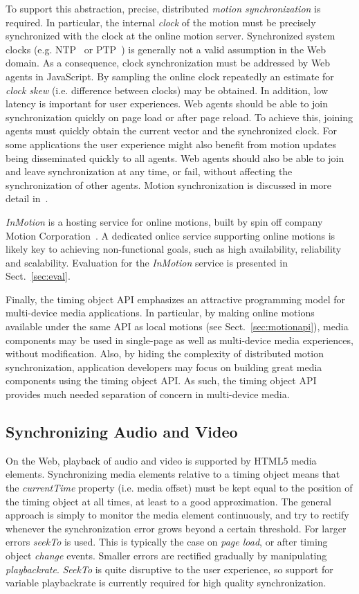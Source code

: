 To support this abstraction, precise, distributed \emph{motion
synchronization} is required. In particular, the internal \emph{clock} of the
motion must be precisely synchronized with the clock at the online motion
server. Synchronized system clocks (e.g. NTP~\cite{ntp} or PTP~\cite{ptp}) is generally not a valid
assumption in the Web domain. As a consequence, clock synchronization must be
addressed by Web agents in JavaScript. By sampling the online clock repeatedly
an estimate for \emph{clock skew} (i.e. difference between clocks) may be
obtained. In addition, low latency is important for user experiences. Web
agents should be able to join synchronization quickly on page load or after
page reload. To achieve this, joining agents must quickly obtain the current
vector and the synchronized clock. For some applications the user experience
might also benefit from motion updates being disseminated quickly to all
agents. Web agents should also be able to join and leave synchronization at
any time, or fail, without affecting the synchronization of other agents.
Motion synchronization is discussed in more detail in~\cite{msv}.

\emph{InMotion} is a hosting service for online motions, built by spin off
company Motion Corporation~\cite{mcorp}. A dedicated onlice service supporting
online motions is likely key to achieving non-functional goals, such as
high availability, reliability and scalability. Evaluation for the
\emph{InMotion} service is presented in Sect.~\ref{sec:eval}.

Finally, the timing object API emphasizes an attractive programming model for
multi-device media applications. In particular, by making online motions
available under the same API as local motions (see Sect.~\ref{sec:motionapi}),
media components may be used in single-page as well as multi-device media
experiences, without modification. Also, by hiding the complexity of
distributed motion synchronization, application developers may focus on
building great media components using the timing object API. As such, the
timing object API provides much needed separation of concern in multi-device
media.

\subsection{Synchronizing Audio and Video}
\label{sec:avsync}

On the Web, playback of audio and video is supported by HTML5 media
elements\cite{html5media}. Synchronizing media elements relative to a timing
object means that the \emph{currentTime} property (i.e. media offset) must be
kept equal to the position of the timing object at all times, at least to a
good approximation. The general approach is simply to monitor the media
element continuously, and try to rectify whenever the synchronization error
grows beyond a certain threshold. For larger errors \emph{seekTo} is used. This is
typically the case on \emph{page load}, or after timing object \emph{change} events. Smaller
errors are rectified gradually by manipulating \emph{playbackrate}. \emph{SeekTo} is
quite disruptive to the user experience, so support for variable playbackrate
is currently required for high quality synchronization.

